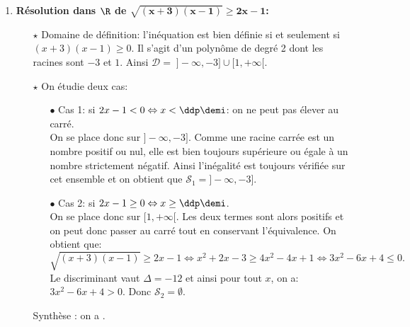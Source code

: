 \begin{correction}
\begin{enumerate}
\item \textbf{R\'esolution dans $\mathbf{\R}$ de $\mathbf{\sqrt{(x+3)(x-1)}\geq 2x-1}$:}\\
\noindent 
\begin{itemize}
\item[$\star$] Domaine de d\'efinition: l'in\'equation est bien d\'efinie si et seulement si $(x+3)(x-1) \geq 0$. Il s'agit d'un polyn\^{o}me de degr\'e 2 dont les racines sont $-3$ et $1$. Ainsi $\mathcal{D}= \; \rbrack -\infty, -3\rbrack\cup\lbrack 1,+\infty\lbrack$.
\item[$\star$] On \'etudie deux cas:
\begin{itemize}
\item[$\bullet$] Cas 1: si $2x-1<0\Leftrightarrow x<\ddp\demi$: on ne peut pas \'elever au carr\'e.\\
\noindent On se place donc sur $\rbrack -\infty, -3\rbrack$. Comme une racine carr\'ee est un nombre positif ou nul, elle est bien toujours sup\'erieure ou \'egale \`{a} un nombre strictement n\'egatif. Ainsi l'in\'egalit\'e est toujours v\'erifi\'ee sur cet ensemble et on obtient que $\mathcal{S}_1=\rbrack -\infty, -3\rbrack$.
\item[$\bullet$] Cas 2: si $2x-1\geq 0\Leftrightarrow x\geq \ddp\demi$.\\
\noindent On se place donc sur $\lbrack 1,+\infty \lbrack$. Les deux termes sont alors positifs et on peut donc passer au carr\'e tout en conservant l'\'equivalence. On obtient que:
$$\sqrt{(x+3)(x-1)}\geq 2x-1 \Leftrightarrow x^2+2x-3\geq 4x^2-4x+1\Leftrightarrow 3x^2-6x+4\leq 0.$$
Le discriminant vaut $\Delta=-12$ et ainsi pour tout $x$, on a: $3x^2-6x+4 >0$. Donc $\mathcal{S}_2=\emptyset$.
\end{itemize}
Synth\`ese : on a .
\end{itemize}

\end{enumerate}
\end{correction}
